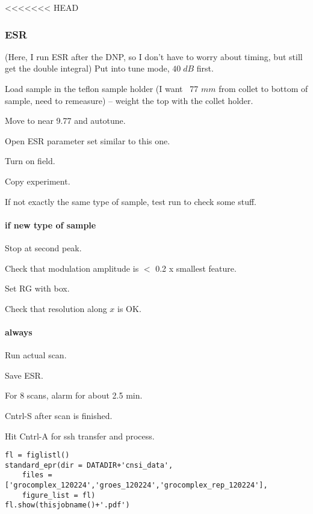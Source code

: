 <<<<<<< HEAD
\subsubsection{ESR}

(Here, I run ESR after the DNP, so I don't have to worry about timing, but still get the double integral)
Put into tune mode, $40\;dB$ first.

Load sample in the teflon sample holder (I want ~77 $mm$ from collet to bottom of sample, need to remeasure) -- weight the top with the collet holder.

Move to near 9.77 and autotune.

Open ESR parameter set similar to this one.

Turn on field.

Copy experiment.

If not exactly the same type of sample, test run to check some stuff.


\paragraph{if new type of sample}
Stop at second peak.

Check that modulation amplitude is $<$ 0.2 x smallest feature.

Set RG with box.

Check that resolution along $x$ is OK.

\paragraph{always}

Run actual scan.

Save ESR.

For 8 scans, alarm for about 2.5 min.

Cntrl-S after scan is finished.

Hit Cntrl-A for ssh transfer and process.


\begin{tiny}
\begin{lstlisting}
fl = figlistl()
standard_epr(dir = DATADIR+'cnsi_data',
    files = ['grocomplex_120224','groes_120224','grocomplex_rep_120224'],
    figure_list = fl)
fl.show(thisjobname()+'.pdf')
\end{lstlisting}
\end{tiny}

